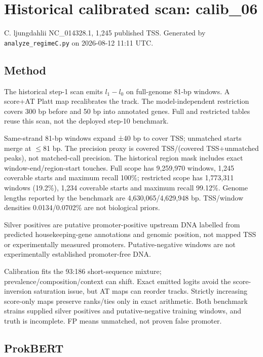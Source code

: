 \documentclass[10pt]{article}
\begin{document}
\section{Historical calibrated scan: calib\_06}\label{historical-calibrated-scan-calib_06}

C. ljungdahlii NC\_014328.1, 1,245 published TSS. Generated by \texttt{analyze\_regimeC.py} on 2026-08-12 11:11 UTC.

\subsection{Method}\label{method}

The historical step-1 scan emits \(l_1-l_0\) on full-genome 81-bp windows. A score+AT Platt map recalibrates the track. The model-independent restriction covers 300 bp before and 50 bp into annotated genes. Full and restricted tables reuse this scan, not the deployed step-10 benchmark.

Same-strand 81-bp windows expand ±40 bp to cover TSS; unmatched starts merge at \ensuremath{\leq}81 bp. The precision proxy is covered TSS/(covered TSS+unmatched peaks), not matched-call precision. The historical region mask includes exact window-end/region-start touches. Full scope has 9,259,970 windows, 1,245 coverable starts and maximum recall 100\%; restricted scope has 1,773,311 windows (19.2\%), 1,234 coverable starts and maximum recall 99.12\%. Genome lengths reported by the benchmark are 4,630,065/4,629,948 bp. TSS/window densities 0.0134/0.0702\% are not biological priors.

Silver positives are putative promoter-positive upstream DNA labelled from predicted housekeeping-gene annotations and genomic position, not mapped TSS or experimentally measured promoters. Putative-negative windows are not experimentally established promoter-free DNA.

Calibration fits the 93:186 short-sequence mixture; prevalence/composition/context can shift. Exact emitted logits avoid the score-inversion saturation issue, but AT maps can reorder tracks. Strictly increasing score-only maps preserve ranks/ties only in exact arithmetic. Both benchmark strains supplied silver positives and putative-negative training windows, and truth is incomplete. FP means unmatched, not proven false promoter.

\subsection{ProkBERT}\label{prokbert}
\end{document}

